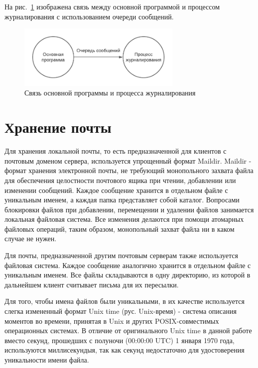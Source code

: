 \documentclass[a4paper,12pt]{report}
\begin{document}
На рис.~\ref{fig:ipc} изображена связь между основной программой и процессом журналирования с использованием очереди сообщений.

\begin{figure}[h]
    \centering
    \includegraphics[width=0.7\textwidth]{pics/ipc.pdf}
    \caption{Связь основной программы и процесса журналирования}
    \label{fig:ipc}
\end{figure}


\section{Хранение почты}

Для хранения локальной почты, то есть предназначенной для клиентов с почтовым доменом сервера, используется упрощенный формат Maildir. Maildir - формат хранения электронной почты, не требующий монопольного захвата файла для обеспечения целостности почтового ящика при чтении, добавлении или изменении сообщений. Каждое сообщение хранится в отдельном файле с уникальным именем, а каждая папка представляет собой каталог. Вопросами блокировки файлов при добавлении, перемещении и удалении файлов занимается локальная файловая система. Все изменения делаются при помощи атомарных файловых операций, таким образом, монопольный захват файла ни в каком случае не нужен.

Для почты, предназначенной другим почтовым серверам также используется файловая система. Каждое сообщение аналогично хранится в отдельном файле с уникальным именем. Все файлы складываются в одну директорию, из которой в дальнейшем клиент считывает письма для их пересылки. 

Для того, чтобы имена файлов были уникальными, в их качестве используется слегка измененный формат Unix time (рус. Unix-время) - система описания моментов во времени, принятая в Unix и других POSIX-совместимых операционных системах. В отличие от оригинального Unix time в данной работе вместо секунд, прошедших с полуночи (00:00:00 UTC) 1 января 1970 года, используются миллисекундыя, так как секунд недостаточно для удостоверения уникальности имени файла.
\end{document}
